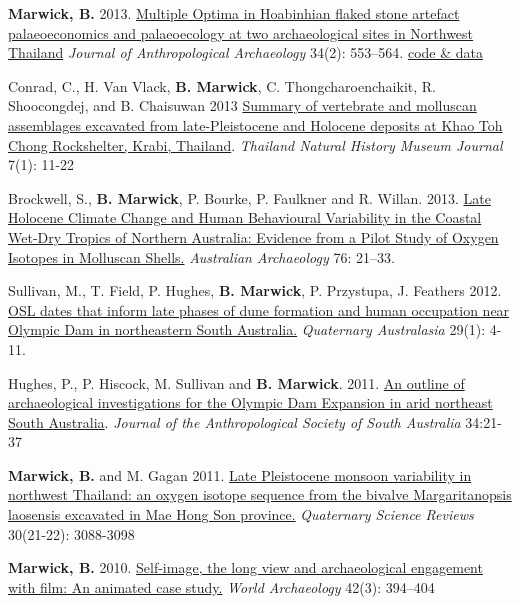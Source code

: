 \documentclass[11pt,article,oneside]{memoir}
\begin{document}
{{{{\ind \textbf{Marwick, B.} 2013. \href{http://faculty.washington.edu/bmarwick/PDFs/Marwick_2013_JAA.pdf}{Multiple Optima in Hoabinhian flaked stone artefact palaeoeconomics and palaeoecology at two archaeological sites in Northwest Thailand} \textit{Journal of Anthropological Archaeology} 34(2): 553–564. \href{http://dx.doi.org/10.6084/m9.figshare.765252}{code \& data}

\ind Conrad, C., H. Van Vlack, \textbf{B. Marwick}, C. Thongcharoenchaikit, R. Shoocongdej, and B. Chaisuwan 2013 \href{http://faculty.washington.edu/bmarwick/PDFs/Conrad_et_al_2013_TNHMJ.pdf}{Summary of vertebrate and molluscan assemblages excavated from late-Pleistocene and Holocene deposits at Khao Toh Chong Rockshelter, Krabi, Thailand}. \textit{Thailand Natural History Museum Journal} 7(1): 11-22

\ind Brockwell, S., \textbf{B. Marwick}, P. Bourke, P. Faulkner and R. Willan. 2013. \href{http://faculty.washington.edu/bmarwick/PDFs/Brockwell_et_al_2013_AA.pdf}{Late Holocene Climate Change and Human Behavioural Variability in the Coastal Wet-Dry Tropics of Northern Australia: Evidence from a Pilot Study of Oxygen Isotopes in Molluscan Shells.} \textit{Australian Archaeology} 76: 21–33.

\ind Sullivan, M., T. Field, P. Hughes, \textbf{B. Marwick}, P. Przystupa, J. Feathers 2012. \href{http://faculty.washington.edu/bmarwick/PDFs/Sullivan_et_al_2012_OSL_dates_ODX.pdf}{OSL dates that inform late phases of dune formation and human occupation near Olympic Dam in northeastern South Australia.} \textit{Quaternary Australasia} 29(1): 4-11.

\ind Hughes, P., P. Hiscock, M. Sullivan and \textbf{B. Marwick}. 2011. \href{http://faculty.washington.edu/bmarwick/PDFs/Hughes_et_al_2011_JASSA.pdf}{An outline of archaeological investigations for the Olympic Dam Expansion in arid northeast South Australia}. \textit{Journal of the Anthropological Society of South Australia} 34:21-37

\ind \textbf{Marwick, B.} and M. Gagan 2011. \href{http://faculty.washington.edu/bmarwick/PDFs/Marwick_and_Gagan_2011_QSR.pdf}{Late Pleistocene monsoon variability in northwest Thailand: an oxygen isotope sequence from the bivalve Margaritanopsis laosensis excavated in Mae Hong Son province.} \textit{Quaternary Science Reviews} 30(21-22): 3088-3098

\ind \textbf{Marwick, B.} 2010. \href{http://faculty.washington.edu/bmarwick/PDFs/Marwick_2010_WA_Wall-E.pdf}{Self-image, the long view and archaeological engagement with film: An animated case study.} \textit{World Archaeology} 42(3): 394–404

}}}}
\end{document}

